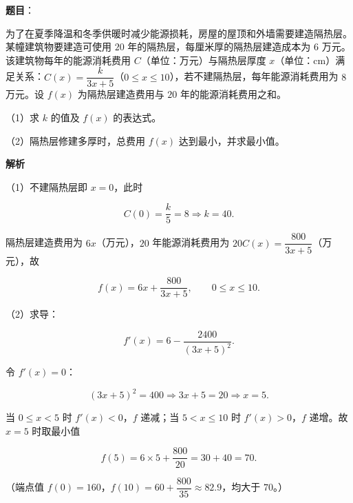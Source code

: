 \begin{answer}

\textbf{题目}：

为了在夏季降温和冬季供暖时减少能源损耗，房屋的屋顶和外墙需要建造隔热层。某幢建筑物要建造可使用 $20$ 年的隔热层，每厘米厚的隔热层建造成本为 $6$ 万元。该建筑物每年的能源消耗费用 $C$（单位：万元）与隔热层厚度 $x$（单位：cm）满足关系：$C(x)=\dfrac{k}{3x+5}$（$0\leqslant x\leqslant10$），若不建隔热层，每年能源消耗费用为 $8$ 万元。设 $f(x)$ 为隔热层建造费用与 $20$ 年的能源消耗费用之和。

（1）求 $k$ 的值及 $f(x)$ 的表达式。

（2）隔热层修建多厚时，总费用 $f(x)$ 达到最小，并求最小值。

\textbf{解析}

（1）不建隔热层即 $x=0$，此时

\nopagebreak[4]
\[C(0)=\frac k5=8\Longrightarrow k=40.\]

隔热层建造费用为 $6x$（万元），$20$ 年能源消耗费用为 $20C(x)=\dfrac{800}{3x+5}$（万元），故

\nopagebreak[4]
\[f(x)=6x+\frac{800}{3x+5},\qquad 0\leqslant x\leqslant10.\]

（2）求导：

\nopagebreak[4]
\[f'(x)=6-\frac{2400}{(3x+5)^2}.\]

令 $f'(x)=0$：

\nopagebreak[4]
\[(3x+5)^2=400\Longrightarrow 3x+5=20\Longrightarrow x=5.\]

当 $0\leqslant x<5$ 时 $f'(x)<0$，$f$ 递减；当 $5<x\leqslant10$ 时 $f'(x)>0$，$f$ 递增。故 $x=5$ 时取最小值

\nopagebreak[4]
\[f(5)=6\times5+\frac{800}{20}=30+40=70.\]

（端点值 $f(0)=160$，$f(10)=60+\dfrac{800}{35}\approx82.9$，均大于 $70$。）


\end{answer}
